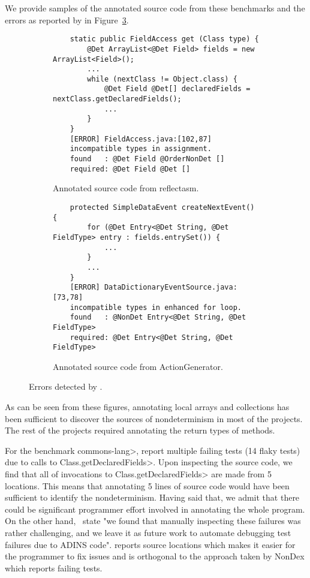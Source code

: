 We provide samples of the annotated source code from these benchmarks and the errors as reported by \TheDeterminismChecker 
in Figure~\ref{fig:nondex-source}.
\begin{figure}
    \centering
    \begin{subfigure}[b]{0.95\textwidth}
        \begin{verbatim}
    static public FieldAccess get (Class type) {
        @Det ArrayList<@Det Field> fields = new ArrayList<Field>();
        ...
        while (nextClass != Object.class) {
            @Det Field @Det[] declaredFields = nextClass.getDeclaredFields();
            ...
        }
    }
    [ERROR] FieldAccess.java:[102,87] 
    incompatible types in assignment.
    found   : @Det Field @OrderNonDet []
    required: @Det Field @Det []
        \end{verbatim}
        \caption{Annotated source code from reflectasm. \vspace{0.5cm}}
        \label{code-reflectasm}
    \end{subfigure}

    \begin{subfigure}[b]{0.95\textwidth}
        \begin{verbatim}
    protected SimpleDataEvent createNextEvent() {
        for (@Det Entry<@Det String, @Det FieldType> entry : fields.entrySet()) {
            ...
        }
        ...
    }
    [ERROR] DataDictionaryEventSource.java:[73,78] 
    incompatible types in enhanced for loop.
    found   : @NonDet Entry<@Det String, @Det FieldType>
    required: @Det Entry<@Det String, @Det FieldType>
        \end{verbatim}
        \caption{Annotated source code from ActionGenerator.}
        \label{code-actiongenerator}
    \end{subfigure}    
    \caption{Errors detected by \TheDeterminismChecker.}
    \label{fig:nondex-source}
\end{figure}
As can be seen from these figures, annotating local arrays and collections
has been sufficient to discover the sources of nondeterminism in most of the projects.
The rest of the projects required annotating the return types of methods.

For the benchmark \<commons-lang>, \cite{nondex} report multiple failing tests (14 flaky tests) due to calls
to \<Class.getDeclaredFields>. Upon inspecting the source code, we find that all of invocations to
\<Class.getDeclaredFields> are made from 5 locations. This means that annotating 5 lines of source code
would have been sufficient to identify the nondeterminism. Having said that, we admit that there could be
significant programmer effort involved in annotating the whole program. On the other hand,~\cite{nondex}
state "we found that manually inspecting these failures was
rather challenging, and we leave it as future work to automate
debugging test failures due to ADINS code". \TheDeterminismChecker reports source locations
which makes it easier for the programmer to fix issues and is orthogonal to the approach taken by NonDex which
reports failing tests.

